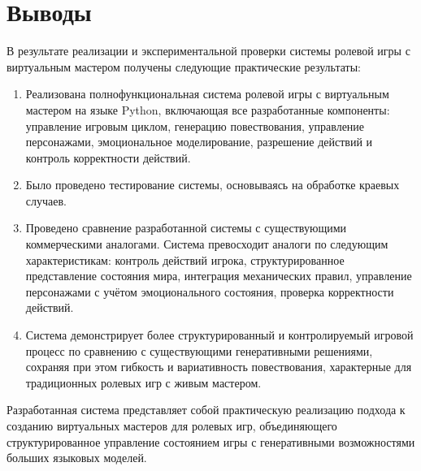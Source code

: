 \section{Выводы}

В результате реализации и экспериментальной проверки системы ролевой игры с виртуальным мастером получены следующие практические результаты:

\begin{enumerate}
	\item Реализована полнофункциональная система ролевой игры с виртуальным мастером на языке Python, включающая все разработанные компоненты: управление игровым циклом, генерацию повествования, управление персонажами, эмоциональное моделирование, разрешение действий и контроль корректности действий.
  
  \item Было проведено тестирование системы, основываясь на обработке краевых случаев.
	
	\item Проведено сравнение разработанной системы с существующими коммерческими аналогами. Система превосходит аналоги по следующим характеристикам: контроль действий игрока, структурированное представление состояния мира, интеграция механических правил, управление персонажами с учётом эмоционального состояния, проверка корректности действий.
	
	\item Система демонстрирует более структурированный и контролируемый игровой процесс по сравнению с существующими генеративными решениями, сохраняя при этом гибкость и вариативность повествования, характерные для традиционных ролевых игр с живым мастером.
\end{enumerate}

Разработанная система представляет собой практическую реализацию подхода к созданию виртуальных мастеров для ролевых игр, объединяющего структурированное управление состоянием игры с генеративными возможностями больших языковых моделей.

